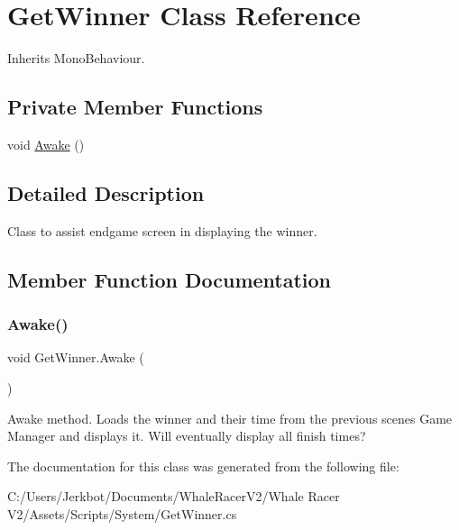 \hypertarget{class_get_winner}{}\section{Get\+Winner Class Reference}
\label{class_get_winner}


Inherits Mono\+Behaviour.

\subsection*{Private Member Functions}
\begin{DoxyCompactItemize}
\item 
void \hyperlink{class_get_winner_a7139b18ae2039648bf5e60d0cb20c511}{Awake} ()
\end{DoxyCompactItemize}


\subsection{Detailed Description}
Class to assist endgame screen in displaying the winner. 



\subsection{Member Function Documentation}
\mbox{\label{class_get_winner_a7139b18ae2039648bf5e60d0cb20c511}} 
\subsubsection{\texorpdfstring{Awake()}{Awake()}}
{\footnotesize\ttfamily void Get\+Winner.\+Awake (\begin{DoxyParamCaption}{ }\end{DoxyParamCaption})\hspace{0.3cm}{\ttfamily [private]}}



Awake method. Loads the winner and their time from the previous scene\textquotesingle{}s Game Manager and displays it. Will eventually display all finish times? 



The documentation for this class was generated from the following file\+:\begin{DoxyCompactItemize}
\item 
C\+:/\+Users/\+Jerkbot/\+Documents/\+Whale\+Racer\+V2/\+Whale Racer V2/\+Assets/\+Scripts/\+System/Get\+Winner.\+cs\end{DoxyCompactItemize}
